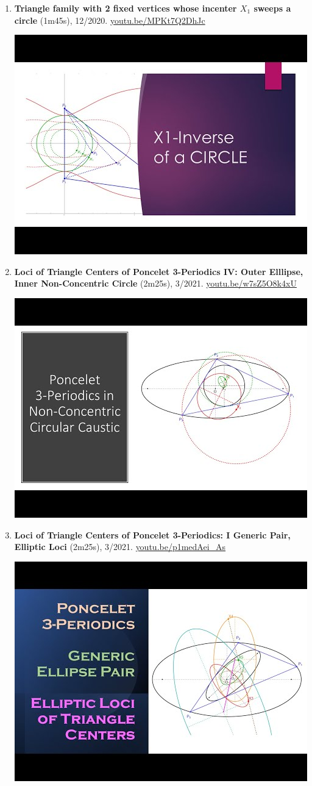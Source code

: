 \documentclass[12pt]{article}
\begin{document}
\begin{enumerate}[resume]
% 
\item \textbf{Triangle family with 2 fixed vertices whose incenter $X_{1}$ sweeps a circle} (1m45s), 12/2020. \href{https://youtu.be/MPKt7Q2DhJc}{\url{youtu.be/MPKt7Q2DhJc}}
\begin{center}\includegraphics[width=.5\textwidth]{pics/MPKt7Q2DhJc.jpg}\end{center}
% 
\item \textbf{Loci of Triangle Centers of Poncelet 3-Periodics IV: Outer Elllipse, Inner Non-Concentric Circle} (2m25s), 3/2021. \href{https://youtu.be/w7sZ5O8k4xU}{\url{youtu.be/w7sZ5O8k4xU}}
\begin{center}\includegraphics[width=.5\textwidth]{pics/w7sZ5O8k4xU.jpg}\end{center}
% 
\item \textbf{Loci of Triangle Centers of Poncelet 3-Periodics: 
I Generic Pair, Elliptic Loci} (2m25s), 3/2021. \href{https://youtu.be/p1medAei_As}{\url{youtu.be/p1medAei\_As}}
\begin{center}\includegraphics[width=.5\textwidth]{pics/p1medAei_As.jpg}\end{center}

\end{enumerate}
\end{document}
